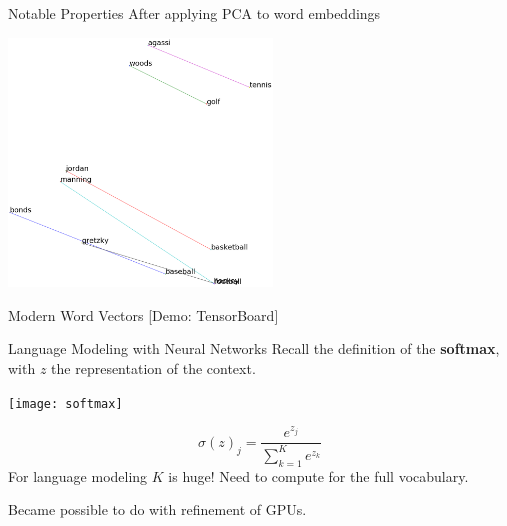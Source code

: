 \documentclass{beamer}
\newcommand{\air}{\vspace{0.25cm}}
\begin{document}







\begin{frame}{Notable Properties}
  After applying PCA to word embeddings
  \air 
  \begin{center}
    \includegraphics[width=7cm]{athletes}
  \end{center}
\end{frame}




\begin{frame}{Modern Word Vectors}  
  [Demo: TensorBoard]
\end{frame}


\begin{frame}{Language Modeling with Neural Networks}
  Recall the definition of the \textbf{softmax}, with $z$ the representation 
  of the context.

  \air


  \begin{center}
    \texttt{[image: softmax]}
  \end{center}
\air

  \[ \sigma(z)_j = \frac{e^{z_j}}{\sum_{k=1}^Ke^{z_{k}}}  \] 
  For language modeling $K$ is huge! Need to compute for the full
  vocabulary.
  \air

  Became possible to do with refinement of GPUs.
\end{frame}
\end{document}

